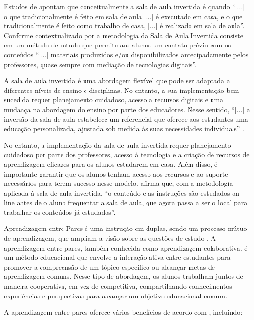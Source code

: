 Estudos de  apontam que conceitualmente a sala de aula invertida é quando ``[...] o que tradicionalmente é feito em sala de aula [...] é executado em casa, e o que tradicionalmente é feito como trabalho de casa, [...] é realizado em sala de aula''. Conforme contextualizado por  a metodologia da Sala de Aula Invertida consiste em um método de estudo que permite aos alunos um contato prévio com os conteúdos ``[...] materiais produzidos e/ou disponibilizados antecipadamente pelos professores, quase sempre com mediação de tecnologias digitais''.

A sala de aula invertida é uma abordagem flexível que pode ser adaptada a diferentes níveis de ensino e disciplinas. No entanto, a sua implementação bem sucedida requer planejamento cuidadoso, acesso a recursos digitais e uma mudança na abordagem do ensino por parte dos educadores. Nesse sentido, ``[...] a inversão da sala de aula estabelece um referencial que oferece aos estudantes uma educação personalizada, ajustada sob medida às suas necessidades individuais'' \cite[p. 22]{BERGMANNSANS2016}.

No entanto, a implementação da sala de aula invertida requer planejamento cuidadoso por parte dos professores, acesso à tecnologia e a criação de recursos de aprendizagem eficazes para os alunos estudarem em casa. Além disso, é importante garantir que os alunos tenham acesso aos recursos e ao suporte necessários para terem sucesso nesse modelo.  afirma que, com a metodologia aplicada à sala de aula invertida, ``o conteúdo e as instruções são estudados on-line antes de o aluno frequentar a sala de aula, que agora passa a ser o local para trabalhar os conteúdos já estudados''.

Aprendizagem entre Pares é uma instrução em duplas, sendo um processo mútuo de aprendizagem, que ampliam a visão sobre as questões de estudo \cite{BACICHMORAN2018}. A aprendizagem entre pares, também conhecida como aprendizagem colaborativa, é um método educacional que envolve a interação ativa entre estudantes para promover a compreensão de um tópico específico ou alcançar metas de aprendizagem comuns. Nesse tipo de abordagem, os alunos trabalham juntos de maneira cooperativa, em vez de competitiva, compartilhando conhecimentos, experiências e perspectivas para alcançar um objetivo educacional comum.

A aprendizagem entre pares oferece vários benefícios de acordo com , incluindo:

